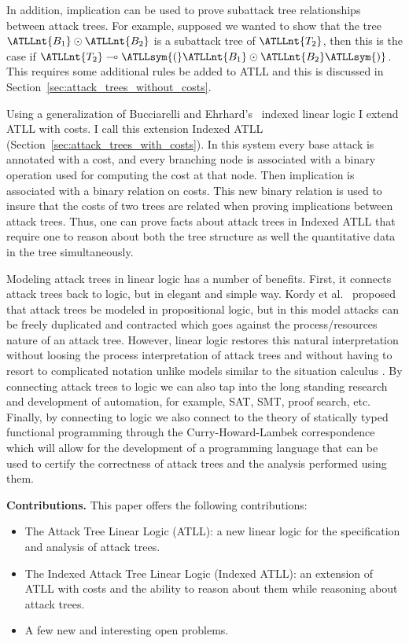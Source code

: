 In addition, implication can be used to prove subattack tree
relationships between attack trees.  For example, supposed we wanted
to show that the tree $\ATLLnt{B_{{\mathrm{1}}}}  \odot  \ATLLnt{B_{{\mathrm{2}}}}$ is a subattack tree of $\ATLLnt{T_{{\mathrm{2}}}}$,
then this is the case if $\ATLLnt{T_{{\mathrm{2}}}}  \multimap  \ATLLsym{(}  \ATLLnt{B_{{\mathrm{1}}}}  \odot  \ATLLnt{B_{{\mathrm{2}}}}  \ATLLsym{)}$. This requires some
additional rules be added to ATLL and this is discussed in
Section~\ref{sec:attack_trees_without_costs}.

Using a generalization of Bucciarelli and
Ehrhard’s~\cite{BUCCIARELLI:2000} indexed linear logic I extend ATLL
with costs.  I call this extension Indexed ATLL
(Section~\ref{sec:attack_trees_with_costs}).  In this system every
base attack is annotated with a cost, and every branching node is
associated with a binary operation used for computing the cost at that
node.  Then implication is associated with a binary relation on costs.
This new binary relation is used to insure that the costs of two trees
are related when proving implications between attack trees.  Thus, one
can prove facts about attack trees in Indexed ATLL that require one to
reason about both the tree structure as well the quantitative data in
the tree simultaneously.

Modeling attack trees in linear logic has a number of benefits.
First, it connects attack trees back to logic, but in elegant and
simple way.  Kordy et al.~\cite{Kordy2010,Kordy:2012} proposed that
attack trees be modeled in propositional logic, but in this model
attacks can be freely duplicated and contracted which goes against the
process/resources nature of an attack tree.  However, linear logic
restores this natural interpretation without loosing the process
interpretation of attack trees and without having to resort to
complicated notation unlike models similar to the situation calculus
\cite{Samarji2013}.  By connecting attack trees to logic we can also
tap into the long standing research and development of automation, for
example, SAT, SMT, proof search, etc.  Finally, by connecting to logic
we also connect to the theory of statically typed functional
programming through the Curry-Howard-Lambek correspondence which will
allow for the development of a programming language that can be used
to certify the correctness of attack trees and the analysis performed
using them.

\textbf{Contributions.}  This paper offers the following
contributions:
\begin{itemize}
\item The Attack Tree Linear Logic (ATLL): a new linear logic for the
  specification and analysis of attack trees.
\item The Indexed Attack Tree Linear Logic (Indexed ATLL): an
  extension of ATLL with costs and the ability to reason about them
  while reasoning about attack trees.
\item A few new and interesting open problems.
\end{itemize}
